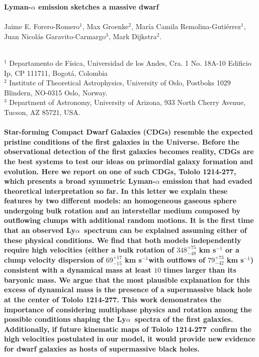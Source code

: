 \documentclass[a4paper, usenatbib, 12pt]{article}
\newcommand{\tol}{Tololo 1214-277}
\newcommand{\lya}{Ly$\alpha$}
\newcommand{\sigmaclump}{$69^{+17}_{-15}$ km s$^{-1}$}
\begin{document}
\pagestyle{empty}
\noindent
\textbf{Lyman-$\alpha$ emission sketches a massive dwarf}
\\
\\
Jaime E. Forero-Romero$^{1}$, Max Groenke$^2$, Mar\'ia Camila
Remolina-Guti\'errez$^1$, Juan Nicol\'as
Garavito-Carmargo$^3$, Mark Dijkstra$^2$.
\\
\\
\scriptsize
{$^1$ Departamento de Física, Universidad de los Andes, Cra. 1
  No. 18A-10 Edificio Ip, CP 111711, Bogot\'a, Colombia 
\\
$^2$ Institute of Theoretical Astrophysics, University of Oslo,
Postboks 1029 Blindern, NO-0315 Oslo, Norway.
\\
$^3$ Department of Astronomy, University of Arizona, 933 North Cherry
Avenue, Tucson, AZ 85721, USA. 
\normalsize
\\
\\
\textbf{
  Star-forming Compact Dwarf Galaxies (CDGs) resemble the expected
  pristine conditions of the first galaxies in the Universe.    
Before the observational detection of the first galaxies becomes
reality, CDGs are the best systems to test our ideas on primordial
galaxy formation and evolution.    
Here we report on one of such CDGs, \tol, which presents
a broad symmetric Lyman-$\alpha$ emission that had evaded theoretical
interpretation so far. 
In this letter we explain these features by two different models: an
homogeneous gaseous sphere undergoing bulk rotation and an interstellar
medium composed by outflowing clumps with additional random motions.
It is the first time that an observed \lya\ spectrum can be explained
assuming either of these physical conditions.
We find that both models independently require high velocities
(either a bulk rotation of $348^{+75}_{-48}$ km s$^{-1}$ or a clump velocity
dispersion of \sigmaclump with outflows of
$79^{+73}_{-42}$ km s$^{-1}$) consistent with a dynamical mass at
least $10$ times larger than its baryonic mass.  
We argue that the most plausible explanation for this excess of
dynamical mass is the presence of a supermassive black hole at the
center of \tol. 
This work demonstrates the importance of considering multiphase
physics and rotation among the possible conditions shaping the
\lya\ spectra of the first galaxies.  
Additionally, if future kinematic maps of \tol\ confirm the high
velocities postulated in our model, it would provide new
evidence for dwarf galaxies as hosts of supermassive black
holes.  
}  



}
\end{document}
